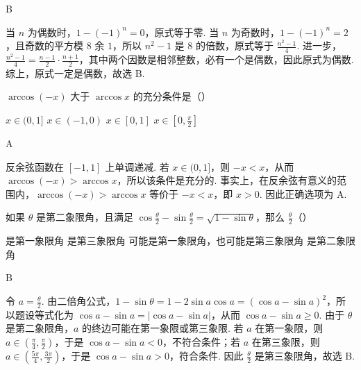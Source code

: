 \begin{answer}
B
\end{answer}

\begin{solution}
当 \(n\) 为偶数时，\(1-(-1)^n=0\)，原式等于零. 当 \(n\) 为奇数时，\(1-(-1)^n=2\)，且奇数的平方模 \(8\) 余 \(1\)，所以 \(n^2-1\) 是 \(8\) 的倍数，原式等于 \(\frac{n^2-1}{4}\). 进一步，\(\frac{n^2-1}{4}=\frac{n-1}{2}\cdot\frac{n+1}{2}\)，其中两个因数是相邻整数，必有一个是偶数，因此原式为偶数. 综上，原式一定是偶数，故选 B.
\end{solution}

\begin{problem}

\(\arccos (-x)\) 大于 \(\arccos x\) 的充分条件是（\quad）

\choices
    {\(x \in (0,1]\)}
    {\(x \in (-1,0)\)}
    {\(x \in [0,1]\)}
    {\(x \in \left[0, \frac{\pi}{2}\right]\)}
\end{problem}

\begin{answer}
A
\end{answer}

\begin{solution}
反余弦函数在 \([-1,1]\) 上单调递减. 若 \(x\in(0,1]\)，则 \(-x<x\)，从而 \(\arccos(-x)>\arccos x\)，所以该条件是充分的. 事实上，在反余弦有意义的范围内，\(\arccos(-x)>\arccos x\) 等价于 \(-x<x\)，即 \(x>0\). 因此正确选项为 A.
\end{solution}

\begin{problem}

如果 \(\theta\) 是第二象限角，且满足 \(\cos \frac{\theta}{2} - \sin \frac{\theta}{2} = \sqrt{1 - \sin \theta}\)，那么 \(\frac{\theta}{2}\)（\quad）

\choices
    {是第一象限角}
    {是第三象限角}
    {可能是第一象限角，也可能是第三象限角}
    {是第二象限角}
\end{problem}

\begin{answer}
B
\end{answer}

\begin{solution}
令 \(a=\frac{\theta}{2}\). 由二倍角公式，\(1-\sin\theta=1-2\sin a\cos a=(\cos a-\sin a)^2\)，所以题设等式化为 \(\cos a-\sin a=\lvert\cos a-\sin a\rvert\)，从而 \(\cos a-\sin a\geqslant0\). 由于 \(\theta\) 是第二象限角，\(a\) 的终边可能在第一象限或第三象限. 若 \(a\) 在第一象限，则 \(a\in\left(\frac{\pi}{4},\frac{\pi}{2}\right)\)，于是 \(\cos a-\sin a<0\)，不符合条件；若 \(a\) 在第三象限，则 \(a\in\left(\frac{5\pi}{4},\frac{3\pi}{2}\right)\)，于是 \(\cos a-\sin a>0\)，符合条件. 因此 \(\frac{\theta}{2}\) 是第三象限角，故选 B.
\end{solution}

